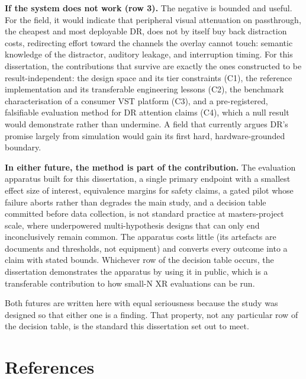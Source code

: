 \textbf{If the system does not work (row 3).} The negative is bounded and useful. For the field, it
would indicate that peripheral visual attenuation on passthrough, the cheapest and most deployable
DR, does not by itself buy back distraction costs, redirecting effort toward the channels the
overlay cannot touch: semantic knowledge of the distractor, auditory leakage, and interruption
timing. For this dissertation, the contributions that survive are exactly the ones constructed to
be result-independent: the design space and its tier constraints (C1), the reference implementation
and its transferable engineering lessons (C2), the benchmark characterisation of a consumer VST
platform (C3), and a pre-registered, falsifiable evaluation method for DR attention claims (C4),
which a null result would demonstrate rather than undermine. A field that currently argues DR's
promise largely from simulation would gain its first hard, hardware-grounded boundary.

\textbf{In either future, the method is part of the contribution.} The evaluation apparatus built for
this dissertation, a single primary endpoint with a smallest effect size of interest, equivalence
margins for safety claims, a gated pilot whose failure aborts rather than degrades the main study,
and a decision table committed before data collection, is not standard practice at
masters-project scale, where underpowered multi-hypothesis designs that can only end inconclusively
remain common. The apparatus costs little (its artefacts are documents and thresholds, not
equipment) and converts every outcome into a claim with stated bounds. Whichever row of the
decision table occurs, the dissertation demonstrates the apparatus by using it in public, which is
a transferable contribution to how small-N XR evaluations can be run.

Both futures are written here with equal seriousness because the study was designed so that either
one is a finding. That property, not any particular row of the decision table, is the standard
this dissertation set out to meet.

\section*{References}


